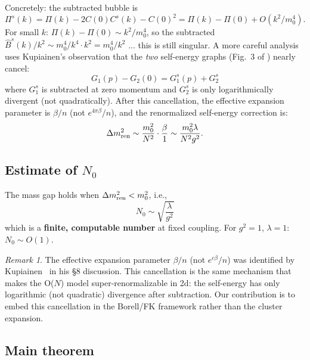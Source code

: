 \documentclass[12pt]{article}
\theoremstyle{definition}
\theoremstyle{remark}
\newtheorem{remark}[theorem]{Remark}
\begin{document}
Concretely: the subtracted bubble is
\begin{equation}
  \Pi^s(k) = \Pi(k) - 2C(0)C^s(k) - C(0)^2
    = \Pi(k) - \Pi(0) + O(k^2/m_0^4).
\end{equation}
For small $k$: $\Pi(k) - \Pi(0) \sim k^2/m_0^4$, so the
subtracted $\hat B^s(k)/k^2 \sim m_0^4/k^4 \cdot k^2 = m_0^4/k^2$
... this is still singular. A more careful analysis uses
Kupiainen's observation that the \emph{two} self-energy graphs
(Fig.~3 of \cite{Kupiainen80}) nearly cancel:
\begin{equation}
  G_1(p) - G_2(0) = G_1^s(p) + G_2^s
\end{equation}
where $G_1^s$ is subtracted at zero momentum and $G_2^s$ is only
logarithmically divergent (not quadratically). After this
cancellation, the effective expansion parameter is $\beta/n$ (not
$e^{4\pi\beta}/n$), and the renormalized self-energy correction is:
\begin{equation}
\label{eq:renorm_selfenergy}
  \Delta m^2_{\rm ren} \sim \frac{m_0^2}{N^2}\cdot
    \frac{\beta}{1} \sim \frac{m_0^2\lambda}{N^2 g^2}.
\end{equation}

\subsection{Estimate of $N_0$}

The mass gap holds when $\Delta m^2_{\rm ren} < m_0^2$, i.e.,
\begin{equation}
\label{eq:N0}
  \boxed{N_0 \sim \sqrt{\frac{\lambda}{g^2}}}
\end{equation}
which is a \textbf{finite, computable number} at fixed coupling.
For $g^2 = 1$, $\lambda = 1$: $N_0 \sim O(1)$.

\begin{remark}
The effective expansion parameter $\beta/n$ (not $e^{c\beta}/n$)
was identified by Kupiainen~\cite{Kupiainen80} in his \S8 discussion.
This cancellation is the same mechanism that makes the O($N$) model
super-renormalizable in 2d: the self-energy has only logarithmic
(not quadratic) divergence after subtraction. Our contribution is
to embed this cancellation in the Borell/FK framework rather than
the cluster expansion.
\end{remark}

\subsection{Main theorem}
\end{document}
